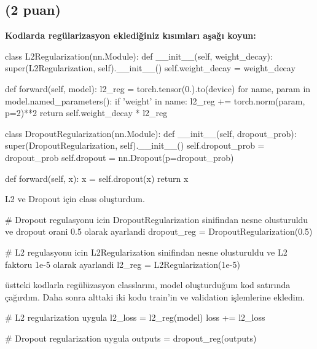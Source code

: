 \documentclass[11pt]{article}
\begin{document}
\subsection{(2 puan)} \textbf{Kodlarda regülarizasyon eklediğiniz kısımları aşağı koyun:} 
\vspace{.4in}
\begin{python}
class L2Regularization(nn.Module):
    def __init__(self, weight_decay):
        super(L2Regularization, self).__init__()
        self.weight_decay = weight_decay

    def forward(self, model):
        l2_reg = torch.tensor(0.).to(device)
        for name, param in model.named_parameters():
            if 'weight' in name:
                l2_reg += torch.norm(param, p=2)**2
        return self.weight_decay * l2_reg

class DropoutRegularization(nn.Module):
    def __init__(self, dropout_prob):
        super(DropoutRegularization, self).__init__()
        self.dropout_prob = dropout_prob
        self.dropout = nn.Dropout(p=dropout_prob)

    def forward(self, x):
        x = self.dropout(x)
        return x
\end{python}
\vspace{.2in}
L2 ve Dropout için class oluşturdum. 

\vspace{.4in}
\begin{python}

# Dropout regulasyonu icin DropoutRegularization sinifindan nesne olusturuldu ve dropout orani 0.5 olarak ayarlandi
dropout_reg = DropoutRegularization(0.5)

# L2 regulasyonu icin L2Regularization sinifindan nesne olusturuldu ve L2 faktoru 1e-5 olarak ayarlandi
l2_reg = L2Regularization(1e-5)
\end{python}
\vspace{.2in}
üstteki kodlarla regülüzasyon classlarını, model oluşturduğum kod satırında çağırdım. Daha sonra alttaki iki kodu train'in ve validation işlemlerine ekledim.

\vspace{.4in}
\begin{python}        
# L2 regularization uygula
l2_loss = l2_reg(model)
loss += l2_loss   

# Dropout regularization uygula
outputs = dropout_reg(outputs)

\end{python}
\newpage
\end{document}
